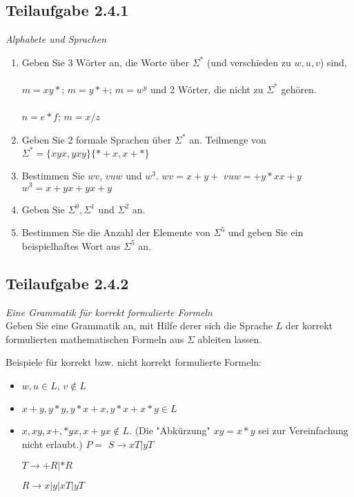 \documentclass[12pt]{article}
\begin{document}
 \subsection*{Teilaufgabe 2.4.1} 
\textit{ {Alphabete und Sprachen}
} 
\\
\begin{enumerate} 
 \item Geben Sie 3 Wörter an, die Worte über ${\Sigma}^*$ (und verschieden zu $w,u,v$) sind,
\\\\
 $m = xy*$;
 $m = y*+$;
 $m=w^y$
  und 2 Wörter, die nicht zu $\Sigma^*$  gehören.
  \\\\
  $n = e *f$;
  $m= x/z$  
 \item Geben Sie 2 formale Sprachen über $\Sigma^*$  an. 
 Teilmenge von ${\Sigma}^* = \{xyx,yxy\} \{*+x,x+*\}$
 \item Bestimmen Sie $w v$, $v u w$ und $w^3$. 
 $wv=x+y+$
 $vuw=+y*xx+y$
 $w^3=x+yx+yx+y$
 \item Geben Sie $\Sigma^0, \Sigma^1$ und $\Sigma^2$ an.  
 \item Bestimmen Sie die Anzahl der Elemente von $\Sigma^5$ und geben Sie ein beispielhaftes Wort aus $\Sigma^5$ an. 
 \end{enumerate} 
  
  
  
 \subsection*{Teilaufgabe 2.4.2} 
\textit{ Eine Grammatik für korrekt formulierte Formeln }
  \\
 Geben Sie eine Grammatik an, mit Hilfe derer sich die Sprache $L$ der korrekt formulierten mathematischen Formeln aus $\Sigma$ ableiten lassen.  
  
 Beispiele für korrekt bzw. nicht korrekt formulierte Formeln: 
 \begin{itemize} 
 \item $w,u \in L$, $v \notin L$ 
 \item $x+y, y*y, y*x+x, y*x+x*y \in L$ 
 \item $x, xy, x+, *yx, x+yx \notin L$. (Die "Abkürzung" $xy = x*y$ sei zur Vereinfachung nicht erlaubt.) 
 $P=$ 
$S \rightarrow xT | yT $

$T \rightarrow +R| *R $

$R \rightarrow x|y|xT|yT$
 \end{itemize} 
  
  
  
  
 
\end{document}
